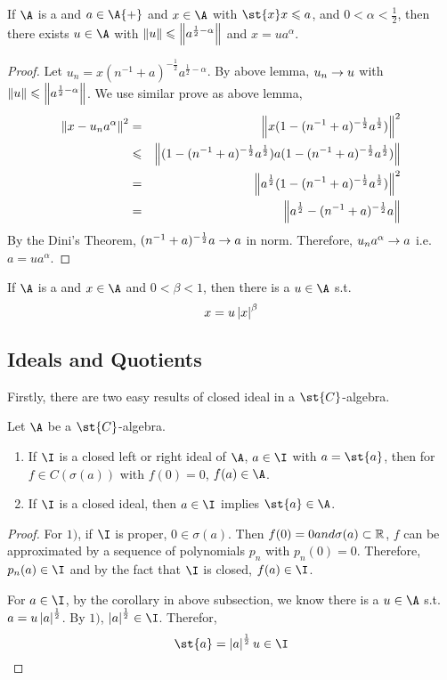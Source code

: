 \begin{prop}
	If $\A$ is a \Cs and $a \in \A{+}$ and $x \in \A$ with $\st{x}x \leqslant a$, and $0<\alpha<\frac{1}{2}$, then there exists $u \in \A$ with $\left\lVert u\right\lVert \leqslant \left\lVert a^{\frac{1}{2}-\alpha}\right\lVert$ and $x=ua^{\alpha}$.
\end{prop}
\begin{proof}
	Let $u_n=x(n^{-1}+a)^{-\frac{1}{2}}a^{\frac{1}{2}-\alpha}$. By above lemma, $u_n \rightarrow u$ with $\left\lVert u\right\lVert \leqslant \left\lVert a^{\frac{1}{2}-\alpha}\right\lVert$. We use similar prove as above lemma, 
	\begin{eqnarray*}
		\left\lVert x-u_na^{\alpha}\right\lVert^2 &=& \left\lVert x(1-(n^{-1}+a)^{-\frac{1}{2}}a^{\frac{1}{2}})\right\lVert^2 \\
		&\leqslant& \left\lVert(1-(n^{-1}+a)^{-\frac{1}{2}}a^{\frac{1}{2}})a(1-(n^{-1}+a)^{-\frac{1}{2}}a^{\frac{1}{2}})\right\lVert \\ 
		&=& \left\lVert a^{\frac{1}{2}}(1-(n^{-1}+a)^{-\frac{1}{2}}a^{\frac{1}{2}})\right\lVert^2 \\
		&=& \left\lVert a^{\frac{1}{2}}-(n^{-1}+a)^{-\frac{1}{2}}a\right\lVert
	\end{eqnarray*}
	By the Dini's Theorem, $(n^{-1}+a)^{-\frac{1}{2}}a \rightarrow a$ in norm. Therefore, $u_na^{\alpha} \rightarrow a$ i.e. $a = ua^{\alpha}$.
\end{proof}
\begin{cor}
	If $\A$ is a \Cs and $x \in \A$ and $0 < \beta <1$, then there is a $u \in \A$ s.t.
	\begin{equation*}
		x = u\left\lvert x\right\lvert^{\beta}	
	\end{equation*}
\end{cor}

\subsection{Ideals and Quotients}

Firstly, there are two easy results of closed ideal in a $\st{C}$-algebra.

\begin{prop}
	Let $\A$ be a $\st{C}$-algebra.
	\begin{enumerate}[label=\arabic*)]
		\item If $\I$ is a closed left or right ideal of $\A$, $a \in \I$ with $a=\st{a}$, then for $f \in C(\sigma(a))$ with $f(0)=0$, $f(a) \in \A$.
		\item If $\I$ is a closed ideal, then $a \in \I$ implies $\st{a} \in \A$.
	\end{enumerate}
\end{prop}
\begin{proof}
	For $1)$, if $\I$ is proper, $0 \in \sigma(a)$. Then $f(0) = 0 and \sigma(a) \subset \mathbb{R}$, $f$ can be approximated by a sequence of polynomials $p_n$ with $p_n(0) = 0$. Therefore, $p_n(a) \in \I$ and by the fact that $\I$ is closed, $f(a) \in \I$.
	\item For $a \in \I$, by the corollary in above subsection, we know there is a $u \in \A$ s.t. $a=u\left\lvert a\right\lvert^{\frac{1}{2}}$. By $1)$, $\abs{a}^{\frac{1}{2}} \in \I$. Therefor,
	\begin{equation*}
		\st{a} = \abs{a}^{\frac{1}{2}} u \in \I \qedhere
	\end{equation*}
\end{proof}

